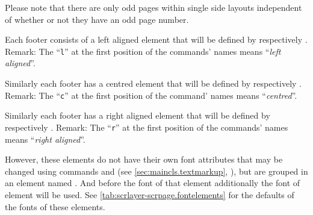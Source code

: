 Please note that there are only odd pages within single
side layouts independent of whether or not they have an odd page number.

Each footer consists of a left aligned element that will be defined by
 respectively . Remark: The ``\texttt{l}'' at the
first position of the commands' names means ``\emph{left aligned}''.

Similarly each footer has a centred element that will be defined by
 respectively . Remark: The ``\texttt{c}'' at the
first position of the command' names means ``\emph{centred}''.

Similarly each footer has a right aligned element that will be defined by
 respectively . Remark: The ``\texttt{r}'' at the
first position of the commands' names means ``\emph{right aligned}''.

%
%
However, these elements do not have their own font attributes that may be
changed using commands  and  (see
\autoref{sec:maincls.textmarkup}, ),
but are grouped in an element named . And before the
font of that element additionally the font of element
 will be used. See
\autoref{tab:scrlayer-scrpage.fontelements} for the defaults of the fonts of
these elements.%
%
%

